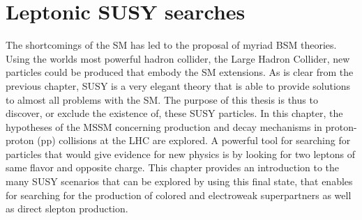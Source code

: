 \chapter{Leptonic SUSY searches} \label{sec:search}
\noindent\justify
The shortcomings of the SM has led to the proposal of myriad BSM theories.
Using the worlds most powerful hadron collider, the Large Hadron Collider, new particles could be produced that embody the SM extensions. 
As is clear from the previous chapter, SUSY is a very elegant theory that is able to provide solutions to almost all problems with the SM. 
The purpose of this thesis is thus to discover, or exclude the existence of, these SUSY particles. 
\newpara
\noindent\justify
In this chapter, the hypotheses of the MSSM concerning production and decay mechanisms in proton-proton (pp) collisions at the LHC are explored. 
A powerful tool for searching for particles that would give evidence for new physics is by looking for two leptons of same flavor and opposite charge. 
This chapter provides an introduction to the many SUSY scenarios that can be explored by using this final state, that enables for searching for the production of colored and electroweak superpartners as well as direct slepton production. 
\newpage
